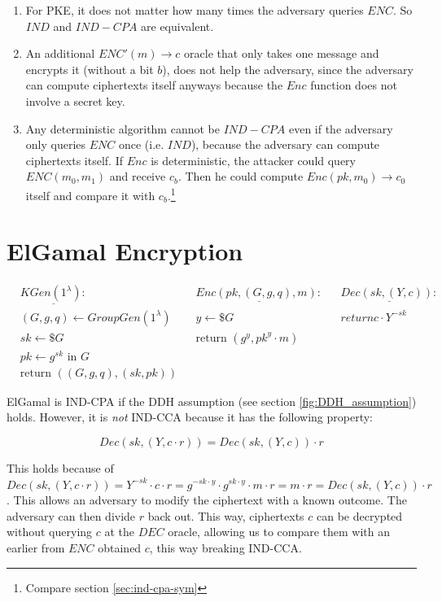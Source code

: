 \begin{enumerate}
    \item For PKE, it does not matter how many times the adversary queries $ENC$. So $IND$ and $IND-CPA$ are equivalent.
    \item An additional $ENC'(m) \rightarrow c$ oracle that only takes one message and encrypts it (without a bit $b$), does not help the adversary, since the adversary can compute ciphertexts itself anyways because the $Enc$ function does not involve a secret key.
    \item Any deterministic algorithm cannot be $IND-CPA$ even if the adversary only queries $ENC$ once (i.e. $IND$), because the adversary can compute ciphertexts itself. If $Enc$ is deterministic, the attacker could query $ENC(m_0, m_1)$ and receive $c_b$. Then he could compute $Enc(pk,m_0) \rightarrow c_0$ itself and compare it with $c_b$.\footnote{Compare section \ref{sec:ind-cpa-sym}}
\end{enumerate}



\section{ElGamal Encryption}\label{sec:elgamal}

\begin{align*}
     & \underline{KGen(1^\lambda):}           &  & \underline{Enc(pk, (G,g,q), m):}   &  & \underline{Dec(sk, (Y,c)):} \\
     & (G,g,q) \leftarrow GroupGen(1^\lambda) &  & y \leftarrow\$ G                   &  & return c \cdot Y^{-sk}      \\
     & sk \leftarrow\$ G                      &  & \text{return } (g^y, pk^y \cdot m) &  &                             \\
     & pk \leftarrow g^{sk} \text{ in } G     &  &                                    &  &                             \\
     & \text{return } ((G,g,q), (sk, pk))     &  &                                    &  &
\end{align*}

ElGamal is IND-CPA if the DDH assumption (see section \ref{fig:DDH_assumption}) holds.
However, it is \emph{not} IND-CCA because it has the following property:

$$
    Dec(sk, (Y, c \cdot r)) = Dec(sk, (Y, c)) \cdot r
$$

This holds because of $Dec(sk, (Y, c \cdot r)) = Y^{-sk} \cdot c \cdot r = g^{-sk \cdot y} \cdot g^{sk \cdot y} \cdot m \cdot r = m \cdot r = Dec(sk, (Y, c)) \cdot r$.
This allows an adversary to modify the ciphertext with a known outcome.
The adversary can then divide $r$ back out.
This way, ciphertexts $c$ can be decrypted without querying $c$ at the $DEC$ oracle, allowing us to compare them with an earlier from $ENC$ obtained $c$, this way breaking IND-CCA.

